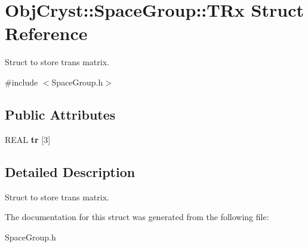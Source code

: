 \hypertarget{struct_obj_cryst_1_1_space_group_1_1_t_rx}{}\section{Obj\+Cryst\+::Space\+Group\+::T\+Rx Struct Reference}
\label{struct_obj_cryst_1_1_space_group_1_1_t_rx}


Struct to store trans matrix.  




{\ttfamily \#include $<$Space\+Group.\+h$>$}

\subsection*{Public Attributes}
\begin{DoxyCompactItemize}
\item 
\mbox{\label{struct_obj_cryst_1_1_space_group_1_1_t_rx_a3a74f496e2afd6b62644789eae6a0a61}} 
R\+E\+AL {\bfseries tr} \mbox{[}3\mbox{]}
\end{DoxyCompactItemize}


\subsection{Detailed Description}
Struct to store trans matrix. 

The documentation for this struct was generated from the following file\+:\begin{DoxyCompactItemize}
\item 
Space\+Group.\+h\end{DoxyCompactItemize}
